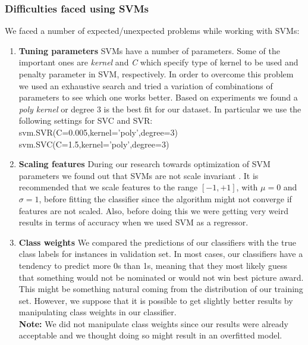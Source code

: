 \documentclass[journal,transmag]{IEEEtran}
\begin{document}
\subsubsection{Difficulties faced using SVMs}
\label{svm}
We faced a number of expected/unexpected problems while working with SVMs:
\begin{enumerate}
\item{\textbf{Tuning parameters}} SVMs have a number of parameters. Some of the important ones are \emph{kernel} and \emph{C} which specify type of kernel to be used and penalty parameter in SVM, respectively. In order to overcome this problem we used an exhaustive search and tried a variation of combinations of parameters to see which one works better. Based on experiments we found a \textit{poly kernel} or degree 3 is the best fit for our dataset. In particular we use the following settings for SVC and SVR:\\
svm.SVR(C=0.005,kernel='poly',degree=3)\\
svm.SVC(C=1.5,kernel='poly',degree=3)

\item{\textbf{Scaling features}} During our research towards optimization of SVM parameters we found out that SVMs are not scale invariant \cite{ref6}. It is recommended that we scale features to the range $[-1, +1]$, with $\mu = 0$ and $\sigma = 1$, before fitting the classifier since the algorithm might not converge if features are not scaled. Also, before doing this we were getting very weird results in terms of accuracy when we used SVM as a regressor.

\item{\textbf{Class weights} We compared the predictions of our classifiers with the true class labels for instances in validation set. In most cases, our classifiers have a tendency to predict more 0s than 1s, m}eaning that they most likely guess that something would not be nominated or would not win best picture award. This might be something natural coming from the distribution of our training set. However, we suppose that it is possible to get slightly better results by manipulating class weights in our classifier.\\
\textbf{Note:} We did not manipulate class weights since our results were already acceptable and we thought doing so might result in an overfitted model.
\end{enumerate}

			
\end{document}
